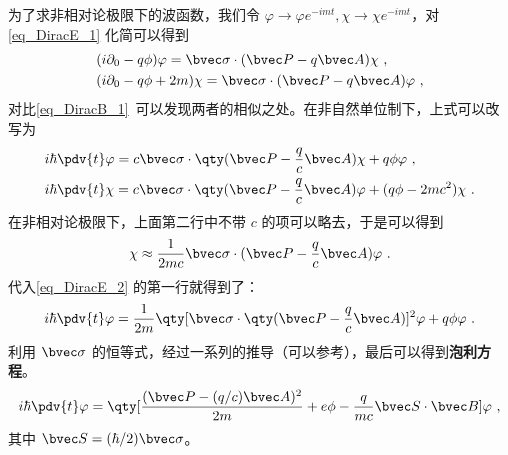 为了求非相对论极限下的波函数，我们令 $\varphi\rightarrow \varphi e^{-imt},\chi\rightarrow \chi e^{-imt}$，对 \autoref{eq_DiracE_1} 化简可以得到
\begin{equation}\label{eq_DiracE_5}
\begin{aligned}
&(i\partial_0 - q \phi)\varphi = \bvec \sigma\cdot (\bvec P-q\bvec A) \chi~,\\
&(i\partial_0 - q \phi + 2m) \chi = \bvec \sigma\cdot (\bvec P-q\bvec A)  \varphi~,
\end{aligned}
\end{equation}
对比\autoref{eq_DiracB_1}~可以发现两者的相似之处。在非自然单位制下，上式可以改写为
\begin{equation}\label{eq_DiracE_2}
\begin{aligned}
&i\hbar \pdv{t} \varphi = c\bvec \sigma\cdot \qty(\bvec P-\frac{q}{c}\bvec A)\chi + q \phi \varphi~,\\
&i\hbar\pdv{t} \chi = c \bvec \sigma\cdot \qty(\bvec P-\frac{q}{c}\bvec A) \varphi + (q \phi-2mc^2) \chi~.
\end{aligned}
\end{equation}
在非相对论极限下，上面第二行中不带 $c$ 的项可以略去，于是可以得到
\begin{equation}
\chi\approx \frac{1}{2mc} \bvec \sigma \cdot(\bvec P-\frac{q}{c}\bvec A)\varphi~.
\end{equation}
代入\autoref{eq_DiracE_2} 的第一行就得到了：
\begin{equation}
i\hbar\pdv{t} \varphi = \frac{1}{2m}\qty[\bvec \sigma \cdot\qty(\bvec P - \frac{q}{c}\bvec A)]^2 \varphi + q\phi  \varphi~.
\end{equation}
利用 $\bvec \sigma$ 的恒等式，经过一系列的推导（可以参考），最后可以得到\textbf{泡利方程}。
\begin{equation}
i\hbar\pdv{t} \varphi = \qty[\frac{(\bvec P - (q/c)\bvec A)^2}{2m}+e\phi-\frac{q}{mc}\bvec S\cdot \bvec B]\varphi~,
\end{equation}
其中 $\bvec S=(\hbar/2)\bvec \sigma$。
